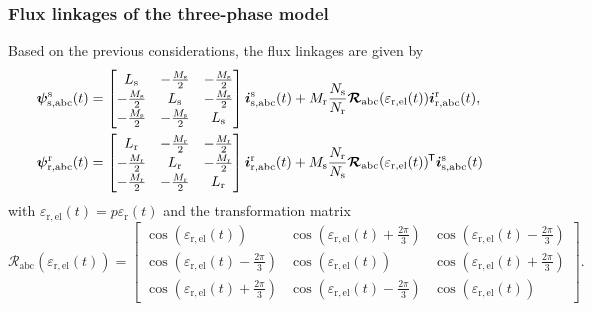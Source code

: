 \begin{frame}
	\frametitle{Flux linkages of the three-phase model}
    Based on the previous considerations, the flux linkages are given by
    \begin{equation}
        \renewcommand*{\arraystretch}{1.15}
        \begin{split}
            \bm{\psi}^\mathrm{s}_\mathrm{s,abc}(t) &=\begin{bmatrix}
                L_\mathrm{s} & -\frac{M_\mathrm{s}}{2} & -\frac{M_\mathrm{s}}{2}\\
                -\frac{M_\mathrm{s}}{2} & L_\mathrm{s} & -\frac{M_\mathrm{s}}{2}\\
                -\frac{M_\mathrm{s}}{2} & -\frac{M_\mathrm{s}}{2} & L_\mathrm{s}
            \end{bmatrix} \bm{i}^\mathrm{s}_\mathrm{s,abc}(t) +  M_{\mathrm{r}}\frac{N_\mathrm{s}}{N_\mathrm{r}} \bm{\mathcal{R}}_\mathrm{abc}(\varepsilon_\mathrm{r,el}(t))\bm{i}^\mathrm{r}_\mathrm{r,abc}(t),\\
            \bm{\psi}^\mathrm{r}_\mathrm{r,abc}(t) &= \begin{bmatrix}
                L_\mathrm{r} & -\frac{M_\mathrm{r}}{2} & -\frac{M_\mathrm{r}}{2}\\
                -\frac{M_\mathrm{r}}{2} & L_\mathrm{r} & -\frac{M_\mathrm{r}}{2}\\
                -\frac{M_\mathrm{r}}{2} & -\frac{M_\mathrm{r}}{2} & L_\mathrm{r}
            \end{bmatrix} \bm{i}^\mathrm{r}_\mathrm{r,abc}(t) +  M_{\mathrm{s}}\frac{N_\mathrm{r}}{N_\mathrm{s}} \bm{\mathcal{R}}_\mathrm{abc}(\varepsilon_\mathrm{r,el}(t))\T\bm{i}^\mathrm{s}_\mathrm{s,abc}(t) 
        \end{split}
        \label{eq:Flux_linkage_model_IM_abc}
    \end{equation}
    with $\varepsilon_\mathrm{r,el}(t)=p\varepsilon_\mathrm{r}(t)$ and the transformation matrix
    \begin{equation}
        \renewcommand*{\arraystretch}{1.15}
        \bm{\mathcal{R}}_\mathrm{abc}(\varepsilon_\mathrm{r,el}(t)) =\begin{bmatrix}
           \cos(\varepsilon_\mathrm{r,el}(t))  & \cos(\varepsilon_\mathrm{r,el}(t) + \frac{2\pi}{3}) & \cos(\varepsilon_\mathrm{r,el}(t) - \frac{2\pi}{3})\\
            \cos(\varepsilon_\mathrm{r,el}(t) - \frac{2\pi}{3}) & \cos(\varepsilon_\mathrm{r,el}(t)) & \cos(\varepsilon_\mathrm{r,el}(t) + \frac{2\pi}{3})\\
            \cos(\varepsilon_\mathrm{r,el}(t) + \frac{2\pi}{3}) & \cos(\varepsilon_\mathrm{r,el}(t) - \frac{2\pi}{3}) & \cos(\varepsilon_\mathrm{r,el}(t))
        \end{bmatrix}.
    \end{equation}
\end{frame}


